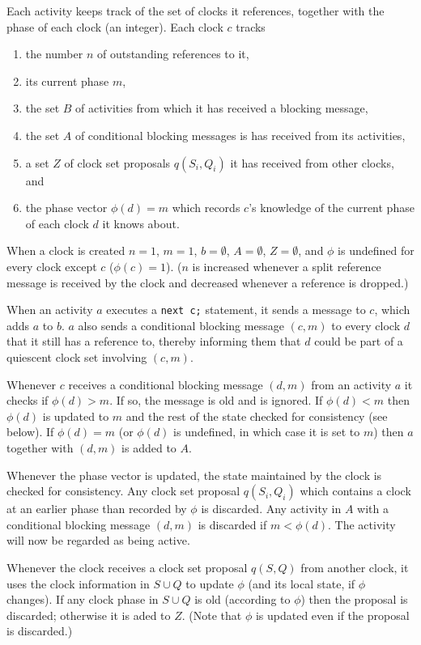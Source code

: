 \documentclass{article}
\begin{document}
{Each activity keeps track of the set of clocks it references, together
with the phase of each clock (an integer). Each clock $c$ tracks 
\begin{enumerate}
\item the number $n$ of outstanding references to it, 
\item its current phase $m$, 
\item the set $B$ of activities from which it has received a blocking message,
\item the set $A$ of conditional blocking messages is has received from its activities,
\item a set $Z$ of  clock set proposals $q(S_i,Q_i)$ it has received from other clocks, and
\item the phase vector $\phi(d)=m$ which records $c$'s knowledge of the 
current phase of each clock $d$ it knows about.
\end{enumerate}
When a clock is created $n=1$, $m=1$, $b=\emptyset$, $A=\emptyset$,
$Z=\emptyset$, and $\phi$ is undefined for every clock except $c$
($\phi(c)=1$). ($n$ is increased whenever a split reference message is
received by the clock and decreased whenever a reference is dropped.)

When an activity $a$ executes a {\tt next c;} statement, it sends a
message to $c$, which adds $a$ to $b$. $a$ also sends a conditional
blocking message $(c,m)$ to every clock $d$ that it still has a
reference to, thereby informing them that $d$ could be part of a
quiescent clock set involving $(c,m)$.

Whenever $c$ receives a conditional blocking message $(d,m)$ from an
activity $a$ it checks if $\phi(d) > m$. If so, the message is old and is
ignored. If $\phi(d) < m$ then $\phi(d)$ is updated to $m$ and the rest of
the state checked for consistency (see below). If $\phi(d)=m$
(or $\phi(d)$ is undefined, in which case it is set to $m$)  then $a$
together with $(d,m)$ is added to $A$. 

Whenever the phase vector is updated, the state maintained by the
clock is checked for consistency. Any clock set proposal $q(S_i,Q_i)$
which contains a clock at an earlier phase than recorded by $\phi$ is
discarded. Any activity in $A$ with a conditional blocking message
$(d,m)$ is discarded if $m < \phi(d)$. The activity will now be regarded
as being active.

Whenever the clock receives a clock set proposal $q(S,Q)$ from another
clock, it uses the clock information in $S \cup Q$ to update $\phi$
(and its local state, if $\phi$ changes). If any clock phase in $S\cup
Q$ is old (according to $\phi$) then the proposal is discarded;
otherwise it is aded to $Z$. (Note that $\phi$ is updated even if the
proposal is discarded.)

}
\end{document}

